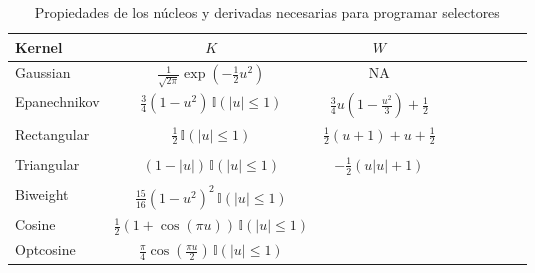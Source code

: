 \documentclass[a4paper,10pt]{article}
\begin{document}
\begin{table}[ht]
\centering
\small
\begin{tabular}{lcccccccc}
\textbf{Kernel} & $K$ & $W$  \\
\toprule
Gaussian & 
$\frac{1}{\sqrt{2\pi}} \exp(-\frac{1}{2}u^2)$ &
NA
\\
Epanechnikov & 
$\frac{3}{4}(1 - u^2) \, \mathbb{I}(|u| \leq 1)$ & 
$\frac{3}{4} u (1-\frac{u^2}{3}) + \frac{1}{2}$ \\
Rectangular & 
$\frac{1}{2} \, \mathbb{I}(|u| \leq 1)$ & 
$\frac{1}{2} (u+1) + u + \frac{1}{2}$ \\
\\
Triangular & 
$(1 - |u|) \, \mathbb{I}(|u| \leq 1)$ & 
$ - \frac{1}{2} \left(u |u| + 1\right) $ \\
\\
Biweight & 
$\frac{15}{16}(1 - u^2)^2 \, \mathbb{I}(|u| \leq 1)$  \\
Cosine & 
$\frac{1}{2}(1 + \cos(\pi u)) \, \mathbb{I}(|u| \leq 1)$  \\
Optcosine & 
$\frac{\pi}{4} \cos\left( \frac{\pi u}{2} \right) \, \mathbb{I}(|u| \leq 1)$ \\
\bottomrule
\end{tabular}
\caption{Propiedades de los núcleos y derivadas necesarias para programar selectores}
\end{table}
\end{document}
